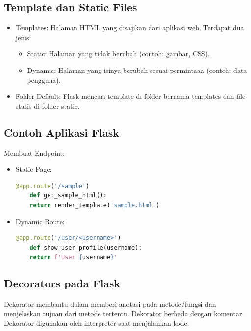 \documentclass{article}
\begin{document}
\subsection{Template dan Static Files}
\begin{itemize}
    \item Templates: Halaman HTML yang disajikan dari aplikasi web. Terdapat
          dua jenis:
          \begin{itemize}
              \item Static: Halaman yang tidak berubah (contoh: gambar, CSS).
              \item Dynamic: Halaman yang isinya berubah sesuai permintaan (contoh: data pengguna).
          \end{itemize}
    \item Folder Default: Flask mencari template di folder bernama templates dan file statis di folder static.
\end{itemize}

\subsection{Contoh Aplikasi Flask}
Membuat Endpoint:
\begin{itemize}
    \item Static Page:
          \begin{lstlisting}[language=Python, caption={}, captionpos=b]
    @app.route('/sample')
    def get_sample_html():
    return render_template('sample.html')
\end{lstlisting}
    \item Dynamic Route:
          \begin{lstlisting}[language=Python, caption={}, captionpos=b]
    @app.route('/user/<username>')
    def show_user_profile(username):
    return f'User {username}'
\end{lstlisting}
\end{itemize}

\subsection{Decorators pada Flask}
Dekorator membantu dalam memberi anotasi pada metode/fungsi dan menjelaskan tujuan dari metode tertentu. Dekorator berbeda dengan komentar. Dekorator digunakan oleh interpreter saat menjalankan kode.
\end{document}
